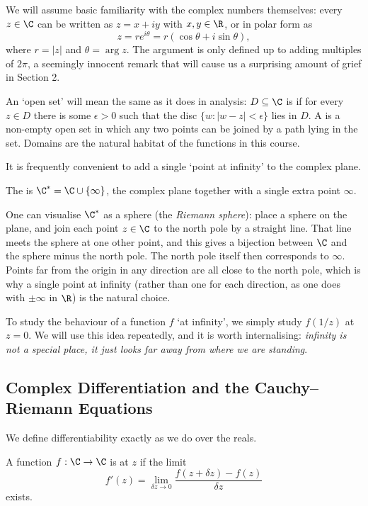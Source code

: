 We will assume basic familiarity with the complex numbers themselves: every $z \in \C$ can be written as $z = x + iy$ with $x, y \in \R$, or in polar form as
$$
z = re^{i\theta} = r(\cos \theta + i \sin \theta),
$$
where $r = |z|$ and $\theta = \arg z$. The argument is only defined up to adding multiples of $2\pi$, a seemingly innocent remark that will cause us a surprising amount of grief in Section 2.

An `open set' will mean the same as it does in analysis: $D \subseteq \C$ is  if for every $z \in D$ there is some $\epsilon > 0$ such that the disc $\{w : |w - z| < \epsilon\}$ lies in $D$. A  is a non-empty open set in which any two points can be joined by a path lying in the set. Domains are the natural habitat of the functions in this course.

It is frequently convenient to add a single `point at infinity' to the complex plane.

\begin{definition}
	The  is $\C^* = \C \cup \{\infty\}$, the complex plane together with a single extra point $\infty$.
\end{definition}

One can visualise $\C^*$ as a sphere (the \emph{Riemann sphere}): place a sphere on the plane, and join each point $z \in \C$ to the north pole by a straight line. That line meets the sphere at one other point, and this gives a bijection between $\C$ and the sphere minus the north pole. The north pole itself then corresponds to $\infty$. Points far from the origin in any direction are all close to the north pole, which is why a single point at infinity (rather than one for each direction, as one does with $\pm\infty$ in $\R$) is the natural choice.

To study the behaviour of a function $f$ `at infinity', we simply study $f(1/z)$ at $z = 0$. We will use this idea repeatedly, and it is worth internalising: \emph{infinity is not a special place, it just looks far away from where we are standing}.

\subsection{Complex Differentiation and the Cauchy--Riemann Equations}

We define differentiability exactly as we do over the reals.

\begin{definition}[Differentiability]
	A function $f : \C \to \C$ is  at $z$ if the limit
	$$
	f'(z) = \lim_{\delta z \to 0} \frac{f(z + \delta z) - f(z)}{\delta z}
	$$
	exists.
\end{definition}

